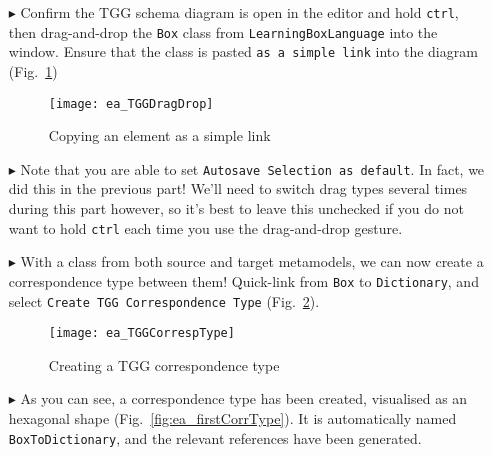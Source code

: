 \begin{itemize}

\item[$\blacktriangleright$] Confirm the TGG schema diagram is open in the editor and hold \texttt{ctrl}, then drag-and-drop the \texttt{Box} class from
\texttt{Learning\-Box\-Language} into the window. Ensure that the class is pasted \texttt{as a simple link} into the diagram (Fig.~\ref{fig:TGGdragDrop})

\vspace{0.5cm}

\begin{figure}[htbp]
\begin{center}
  \texttt{[image: ea\_TGGDragDrop]}
  \caption{Copying an element as a simple link} 
  \label{fig:TGGdragDrop}
\end{center}
\end{figure}

\item[$\blacktriangleright$] Note that you are able to set \texttt{Autosave Selection as default}. In fact, we did this in the previous part! We'll need to
switch drag types several times during this part however, so it's best to leave this unchecked if you do not want to hold \texttt{ctrl} each time you use the
drag-and-drop gesture.

\vspace{0.5cm}

\item[$\blacktriangleright$] With a class from both source and target metamodels, we can now create a correspondence type between them! Quick-link from
\texttt{Box} to \texttt{Dictionary}, and select \texttt{Create TGG Corres\-pon\-dence Type} (Fig.~\ref{fig:create_correspondence}).

\newpage

\begin{figure}[htbp]
\begin{center}
  \texttt{[image: ea\_TGGCorrespType]}
  \caption{Creating a TGG correspondence type} 
  \label{fig:create_correspondence}
\end{center}
\end{figure}

\item[$\blacktriangleright$] As you can see, a correspondence type has been created, visualised as an hexagonal shape (Fig.~\ref{fig:ea_firstCorrType}). It is
automatically named \texttt{BoxToDiction\-ary}, and the relevant references have been generated.


\end{itemize}
